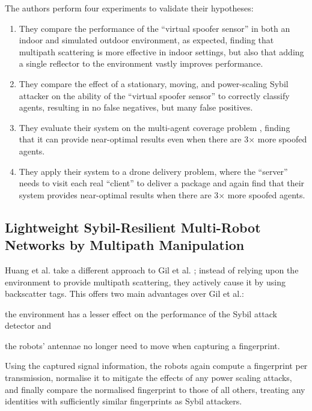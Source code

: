 The authors perform four experiments to validate their hypotheses:
\begin{enumerate}
    \item They compare the performance of the ``virtual spoofer sensor'' in both an indoor and simulated outdoor environment, as expected, finding that multipath scattering is more effective in indoor settings, but also that adding a single reflector to the environment vastly improves performance.
    \item They compare the effect of a stationary, moving, and power-scaling Sybil attacker on the ability of the ``virtual spoofer sensor'' to correctly classify agents, resulting in no false negatives, but many false positives.
    \item They evaluate their system on the multi-agent coverage problem \cite{MultiAgentCoverage}, finding that it can provide near-optimal results even when there are 3$\times$ more spoofed agents.
    \item They apply their system to a drone delivery problem, where the ``server'' needs to visit each real ``client'' to deliver a package and again find that their system provides near-optimal results when there are 3$\times$ more spoofed agents.
\end{enumerate}


\subsection{Lightweight Sybil-Resilient Multi-Robot Networks by Multipath Manipulation}
Huang et al. \cite{MultiPathManipulation} take a different approach to Gil et al. \cite{GuaranteeingSpoofResilience}; instead of relying upon the environment to provide multipath scattering, they actively cause it by using backscatter tags. This offers two main advantages over Gil et al.: \begin{enumerate*}
    \item the environment has a lesser effect on the performance of the Sybil attack detector and
    \item the robots' antennae no longer need to move when capturing a fingerprint.
\end{enumerate*}
Using the captured signal information, the robots again compute a fingerprint per transmission, normalise it to mitigate the effects of any power scaling attacks, and finally compare the normalised fingerprint to those of all others, treating any identities with sufficiently similar fingerprints as Sybil attackers.

